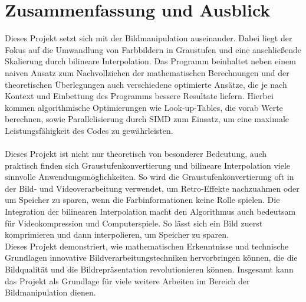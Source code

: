 \documentclass[course=erap]{aspdoc}
\begin{document}
\section{Zusammenfassung und Ausblick}
Dieses Projekt setzt sich mit der Bildmanipulation auseinander. Dabei liegt der Fokus auf die Umwandlung von Farbbildern in Graustufen und eine anschließende Skalierung durch bilineare Interpolation. Das Programm beinhaltet neben einem naiven Ansatz zum Nachvollziehen der mathematischen Berechnungen und der theoretischen Überlegungen auch verschiedene optimierte Ansätze, die je nach Kontext und Einbettung des Programms bessere Resultate liefern. Hierbei kommen algorithmische Optimierungen wie Look-up-Tables, die vorab Werte berechnen, sowie Parallelisierung durch SIMD zum Einsatz, um eine maximale Leistungsfähigkeit des Codes zu gewährleisten.\\\\
Dieses Projekt ist nicht nur theoretisch von besonderer Bedeutung, auch praktisch finden sich Graustufenkonvertierung und bilineare Interpolation viele sinnvolle Anwendungsmöglichkeiten. So wird die Graustufenkonvertierung oft in der Bild- und Videoverarbeitung verwendet, um Retro-Effekte nachzuahmen oder um Speicher zu sparen, wenn die Farbinformationen keine Rolle spielen. Die Integration der bilinearen Interpolation macht den Algorithmus auch bedeutsam für Videokompression und Computerspiele. So lässt sich ein Bild zuerst komprimieren und dann interpolieren, um Speicher zu sparen.\\
Dieses Projekt demonstriert, wie mathematischen Erkenntnisse und technische Grundlagen innovative Bildverarbeitungstechniken hervorbringen können, die die Bildqualität und die Bildrepräsentation revolutionieren können. Insgesamt kann das Projekt als Grundlage für viele weitere Arbeiten im Bereich der Bildmanipulation dienen.


{

\cite{ece472}
\cite{ppm}
\cite{ppmformats}
\cite{pgmpgmpbm}
\cite{grafikgraustufen}
\cite{bilint}
\cite{wahrnehmung}

}
\end{document}
